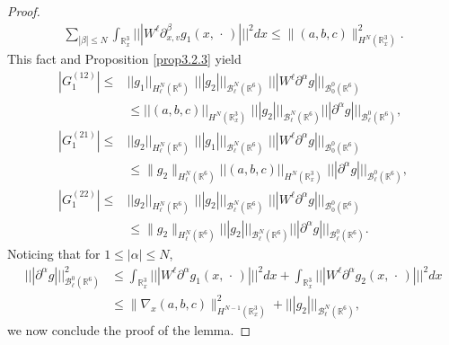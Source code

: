 \documentclass{amsart}[12pt, article]
\begin{document}
\begin{proof}
\begin{align*}
\sum_{|\beta|\le N}\int_{{{{\mathbb R}}}^3_x} |||W^\ell
{{\partial}}^\beta_{x,v} g_1(x,\, \cdot\,)|||^2dx
\le \|(a,b,c)\|^2_{H^{N}({{{\mathbb R}}}^3_x)}.
\end{align*}
This fact and  Proposition \ref{prop3.2.3} yield
 \begin{align*}
|G_1^{(12)}|\le &||g_1||_{H^N_\ell({{{\mathbb R}}}^6)}\,\,
||| g_2|||_{{{\mathcal B}}^{N}_\ell({{{\mathbb R}}}^6)}\,\, ||| W^\ell{{\partial}}^\alpha g|||_{{{\mathcal B}}^0_0({{{\mathbb R}}}^6)}
\\&
 \leq  ||(a,b,c)||_{H^N({{{\mathbb R}}}^3_x)}\,\,
 ||| g_2|||_{{{\mathcal B}}^{N}_\ell({{{\mathbb R}}}^6)}||| {{\partial}}^\alpha g|||_{{{\mathcal B}}^0_\ell({{{\mathbb R}}}^6)},
\\
|G_1^{(21)}|\le&||g_2||_{H^N_\ell({{{\mathbb R}}}^6)}\,\,
||| g_1|||_{{{\mathcal B}}^{N}_\ell({{{\mathbb R}}}^6)}\,\, ||| W^\ell{{\partial}}^\alpha g|||_{{{\mathcal B}}^0_0({{{\mathbb R}}}^6)}
\\&
 \leq \|g_2\|_{H^N_\ell({{{\mathbb R}}}^6)} ||(a,b,c)||_{H^N({{{\mathbb R}}}^3_x)}\,\,
 ||| {{\partial}}^\alpha g|||_{{{\mathcal B}}^0_\ell({{{\mathbb R}}}^6)},
 \\
 |G_1^{(22)}|\le&||g_2||_{H^N_\ell({{{\mathbb R}}}^6)}\,\,
||| g_2|||_{{{\mathcal B}}^{N}_\ell({{{\mathbb R}}}^6)}\,\,
||| W^\ell{{\partial}}^\alpha g|||_{{{\mathcal B}}^0_0({{{\mathbb R}}}^6)}
\\&
 \leq \|g_2\|_{H^N_\ell({{{\mathbb R}}}^6)}
 ||| g_2|||_{{{\mathcal B}}^{N}_\ell({{{\mathbb R}}}^6)}||| {{\partial}}^\alpha g|||_{{{\mathcal B}}^0_\ell({{{\mathbb R}}}^6)}.
 \end{align*}
Noticing that for
 $1\le|\alpha|\le N$,
\begin{align*}
|||  {{\partial}}^\alpha g|||_{{{\mathcal B}}^{0}_\ell({{{\mathbb R}}}^6)}^2&\le
\int_{{{{\mathbb R}}}^3_x} |||W^\ell
{{\partial}}^\alpha g_1(x,\, \cdot\,)|||^2dx
+\int_{{{{\mathbb R}}}^3_x} |||W^\ell
{{\partial}}^\alpha g_2(x,\, \cdot\,)|||^2dx
\\&\le \|\nabla_x(a,b,c)\|^2_{H^{N-1}({{{\mathbb R}}}^3_x)}+
|||g_2|||_{{{\mathcal B}}^N_\ell({{{\mathbb R}}}^6)},
\end{align*}
we  now conclude the proof of the lemma.
\end{proof}
\end{document}
